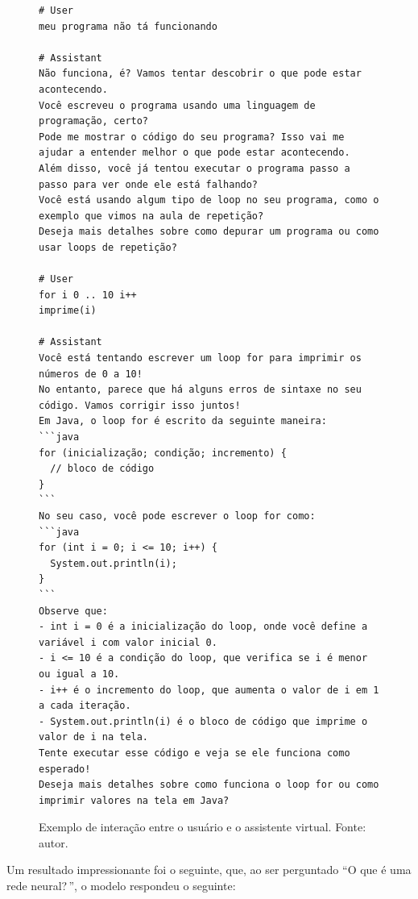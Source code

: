 \documentclass[journal]{IEEEtran}
\begin{document}
\begin{figure}[h]
    \centering
    \begin{verbatim}
# User
meu programa não tá funcionando

# Assistant
Não funciona, é? Vamos tentar descobrir o que pode estar acontecendo.
Você escreveu o programa usando uma linguagem de programação, certo?
Pode me mostrar o código do seu programa? Isso vai me ajudar a entender melhor o que pode estar acontecendo.
Além disso, você já tentou executar o programa passo a passo para ver onde ele está falhando?
Você está usando algum tipo de loop no seu programa, como o exemplo que vimos na aula de repetição?
Deseja mais detalhes sobre como depurar um programa ou como usar loops de repetição?

# User
for i 0 .. 10 i++
imprime(i)

# Assistant
Você está tentando escrever um loop for para imprimir os números de 0 a 10!
No entanto, parece que há alguns erros de sintaxe no seu código. Vamos corrigir isso juntos!
Em Java, o loop for é escrito da seguinte maneira:
```java
for (inicialização; condição; incremento) {
  // bloco de código
}
```
No seu caso, você pode escrever o loop for como:
```java
for (int i = 0; i <= 10; i++) {
  System.out.println(i);
}
```
Observe que:
- int i = 0 é a inicialização do loop, onde você define a variável i com valor inicial 0.
- i <= 10 é a condição do loop, que verifica se i é menor ou igual a 10.
- i++ é o incremento do loop, que aumenta o valor de i em 1 a cada iteração.
- System.out.println(i) é o bloco de código que imprime o valor de i na tela.
Tente executar esse código e veja se ele funciona como esperado!
Deseja mais detalhes sobre como funciona o loop for ou como imprimir valores na tela em Java?
    \end{verbatim}
    \caption{%
    Exemplo de interação entre o usuário e o assistente virtual. Fonte: autor.\label{fig:exemplo_interacao}}
\end{figure}

Um resultado impressionante foi o seguinte, que, ao ser perguntado ``O que é uma rede neural?\,'', o modelo respondeu o seguinte:
\end{document}
